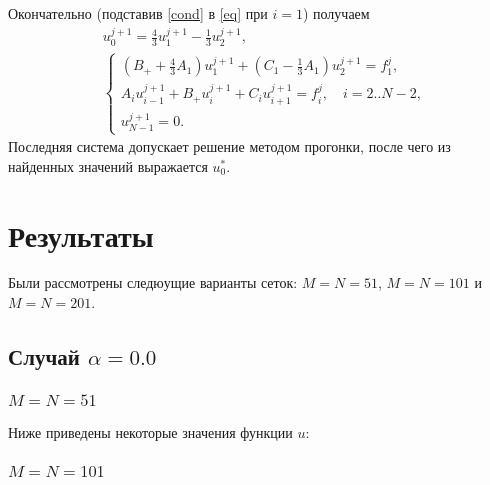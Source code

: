 \documentclass[a4paper,12pt]{article}
\begin{document}
Окончательно (подставив \cref{cond} в \cref{eq} при \(i=1\)) получаем
\begin{align*}
   & u_{0}^{j+1} = \frac{4}{3}u_{1}^{j+1} - \frac{1}{3} u_{2}^{j+1},                                                      \\
   & \begin{cases}
       \left(B_{+} + \frac{4}{3}A_{1}\right) u_{1}^{j+1} + \left(C_{1}- \frac{1}{3}A_{1}\right) u_{2}^{j+1} = f_{1}^{j}, \\
       A_i u_{i-1}^{j+1} + B_{+} u_{i}^{j+1} + C_{i} u_{i+1}^{j+1} =  f_{i}^{j}, \quad i=2..N-2,                         \\
       u_{N-1}^{j+1}=0.
     \end{cases}
\end{align*}
Последняя система допускает решение методом прогонки, после чего из найденных значений выражается \(u_{0}^{*}\).
\section*{Результаты}
Были рассмотрены следюущие варианты сеток: \(M=N=51\), \(M=N=101\) и \(M=N=201\).

\subsection*{Случай \(\alpha=0.0\)}

\subsubsection*{\(M=N=51\)}

Ниже приведены некоторые значения функции \(u\):


\subsubsection*{\(M=N=101\)}
\end{document}
